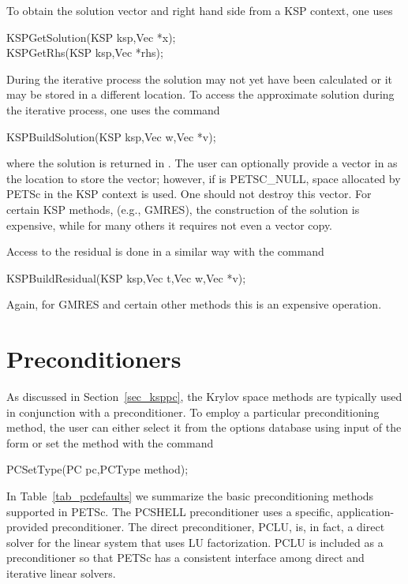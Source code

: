 To obtain the solution vector and right hand side from a KSP
context, one uses
\begin{tabbing}
  KSPGetSolution(KSP ksp,Vec *x);\\
  KSPGetRhs(KSP ksp,Vec *rhs);
\end{tabbing}
During the iterative process
the solution may not yet have been calculated or it may be stored in
a different location. To access the approximate solution during the
iterative process, one uses the command
\begin{tabbing}
  KSPBuildSolution(KSP ksp,Vec w,Vec *v);
\end{tabbing}
where the solution is returned in . The user can optionally provide
a vector in  as the location to store the vector; however, if
 is PETSC\_NULL, space allocated by PETSc in the KSP context is
used. One should not destroy this vector. For certain KSP methods,
(e.g., GMRES), the construction of the solution is expensive, while for many
others it requires not even a vector copy.

Access to the residual is done in a similar way with the
command
\begin{tabbing}
  KSPBuildResidual(KSP ksp,Vec t,Vec w,Vec *v);
\end{tabbing}
Again, for GMRES and certain other methods this is an expensive
operation.

\section{Preconditioners} 
\label{sec_pc}

As discussed in Section~\ref{sec_ksppc}, the Krylov space methods are
typically used in conjunction with a preconditioner.
To employ a particular preconditioning method, the user can either select
it from the options database using input of the form
 or set the method with the
command 
\begin{tabbing}
  PCSetType(PC pc,PCType method);
\end{tabbing}
In Table~\ref{tab_pcdefaults} we summarize the basic
preconditioning methods supported in PETSc.
The PCSHELL preconditioner uses a specific,
application-provided preconditioner.  The direct preconditioner, PCLU,
is, in fact, a direct solver for the linear system that uses LU
factorization. PCLU is included as a preconditioner so that PETSc has a
consistent interface among direct and iterative linear solvers.

